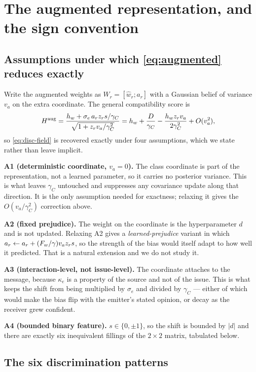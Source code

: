 \section{The augmented representation, and the sign convention}
\label{app:representation}

\subsection{Assumptions under which \eqref{eq:augmented} reduces exactly}

Write the augmented weights as $W_r=[\hat{w}_r; a_r]$ with a Gaussian belief of
variance $v_a$ on the extra coordinate. The general compatibility score is
%
\begin{equation}
  H^{\text{aug}}
  = \frac{h_{w} + \sigma_e\,a_r z_r s/\gamma_C}{\sqrt{1+z_r v_a/\gamma_C^{2}}}
  = h_{w} + \frac{D}{\gamma_C} - \frac{h_{w} z_r v_a}{2\gamma_C^{2}} + O(v_a^{2}),
\end{equation}
%
so \eqref{eq:disc-field} is recovered exactly under four assumptions, which we
state rather than leave implicit.

\textbf{A1 (deterministic coordinate, $v_a=0$).} The class coordinate is part of
the representation, not a learned parameter, so it carries no posterior variance.
This is what leaves $\gamma_C$ untouched and suppresses any covariance update
along that direction. It is the only assumption needed for exactness; relaxing it
gives the $O(v_a/\gamma_C^2)$ correction above.

\textbf{A2 (fixed prejudice).} The weight on the coordinate is the hyperparameter
$d$ and is not updated. Relaxing A2 gives a \emph{learned-prejudice} variant in
which $a_r \leftarrow a_r + (F_{w}/\gamma)v_a z_r s$, so the strength of the bias
would itself adapt to how well it predicted. That is a natural extension and we
do not study it.

\textbf{A3 (interaction-level, not issue-level).} The coordinate attaches to the
message, because $\kappa_e$ is a property of the source and not of the issue.
This is what keeps the shift from being multiplied by $\sigma_e$ and divided by
$\gamma_C$ --- either of which would make the bias flip with the emitter's stated
opinion, or decay as the receiver grew confident.

\textbf{A4 (bounded binary feature).} $s\in\{0,\pm1\}$, so the shift is bounded
by $|d|$ and there are exactly six inequivalent fillings of the $2\times2$
matrix, tabulated below.

\subsection{The six discrimination patterns}

